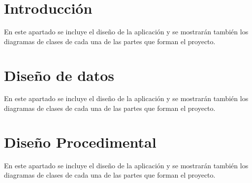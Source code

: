 \section{Introducción}\label{introduccion-diseño}
En este apartado se incluye el diseño de la aplicación y se mostrarán también los diagramas de clases de cada una de las partes que forman el proyecto.

\section{Diseño de datos}\label{ddatos}

En este apartado se incluye el diseño de la aplicación y se mostrarán también los diagramas de clases de cada una de las partes que forman el proyecto.

\section{Diseño Procedimental}\label{dprocedimental}
En este apartado se incluye el diseño de la aplicación y se mostrarán también los diagramas de clases de cada una de las partes que forman el proyecto.





